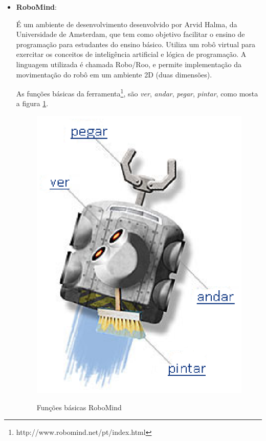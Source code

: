 \begin{itemize}
	\item \textbf{RoboMind}: 

		É um ambiente de desenvolvimento desenvolvido por Arvid Halma, da Universidade de Amsterdam, que tem como objetivo facilitar o ensino de programação para estudantes do ensino básico. Utiliza um robô virtual para exercitar os conceitos de inteligência artificial e lógica de programação. A linguagem utilizada é chamada Robo/Roo, e permite implementação da movimentação do robô em um ambiente 2D (duas dimensões).

		As funções básicas da ferramenta\footnote{http://www.robomind.net/pt/index.html}, são \textit{ver}, \textit{andar}, \textit{pegar}, \textit{pintar}, como mosta a figura \ref{img:funcoesBasicasRoboMind}.

		\begin{figure}[H]
			\centering
			\caption{Funções básicas RoboMind}
			\includegraphics[scale=0.8]{figuras/funcoesBasicasRoboMind.eps}
			\label{img:funcoesBasicasRoboMind}
		\end{figure}


\end{itemize}
